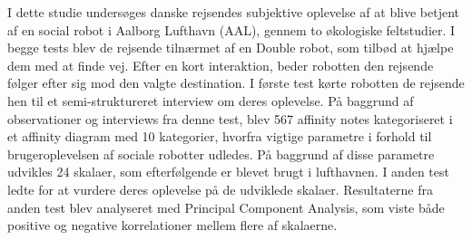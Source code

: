 I dette studie undersøges danske rejsendes subjektive oplevelse af at blive betjent af en social robot i Aalborg Lufthavn (AAL), gennem to økologiske feltstudier. I begge tests blev de rejsende tilnærmet af en Double robot, som tilbød at hjælpe dem med at finde vej. Efter en kort interaktion, beder robotten den rejsende følger efter sig mod den valgte destination. I første test kørte robotten de rejsende hen til et semi-struktureret interview om deres oplevelse. På baggrund af observationer og interviews fra denne test, blev 567 affinity notes kategoriseret i et affinity diagram med 10 kategorier, hvorfra vigtige parametre i forhold til brugeroplevelsen af sociale robotter udledes. På baggrund af disse parametre udvikles 24 skalaer, som efterfølgende er blevet brugt i lufthavnen. I anden test ledte for at vurdere deres oplevelse på de udviklede skalaer. Resultaterne fra anden test blev analyseret med Principal Component Analysis, som viste både positive og negative korrelationer mellem flere af skalaerne. 